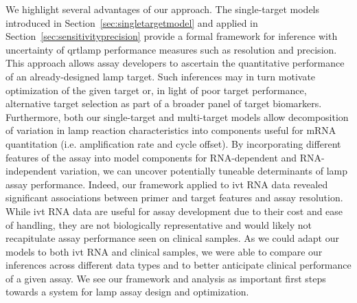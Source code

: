 \documentclass[../thesis.tex]{subfiles}
\begin{document}
We highlight several advantages of our approach. The single-target models introduced in Section~\ref{sec:singletargetmodel} and applied in Section~\ref{sec:sensitivityprecision} provide a formal framework for inference with uncertainty of \gls{qrtlamp} performance measures such as resolution and precision. This approach allows assay developers to ascertain the quantitative performance of an already-designed \gls{lamp} target. Such inferences may in turn motivate optimization of the given target or, in light of poor target performance, alternative target selection as part of a broader panel of target biomarkers. Furthermore, both our single-target and multi-target models allow decomposition of variation in \gls{lamp} reaction characteristics into components useful for mRNA quantitation (i.e. amplification rate and cycle offset). By incorporating different features of the assay into model components for RNA-dependent and RNA-independent variation, we can uncover potentially tuneable determinants of \gls{lamp} assay performance. Indeed, our framework applied to \gls{ivt} RNA data revealed significant associations between primer and target features and assay resolution. While \gls{ivt} RNA data are useful for assay development due to their cost and ease of handling, they are not biologically representative and would likely not recapitulate assay performance seen on clinical samples. As we could adapt our models to both \gls{ivt} RNA and clinical samples, we were able to compare our inferences across different data types and to better anticipate clinical performance of a given assay. We see our framework and analysis as important first steps towards a system for \gls{lamp} assay design and optimization.
\end{document}
